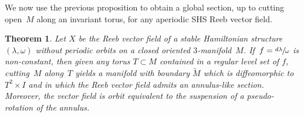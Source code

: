 \documentclass[JEP,XML,SOM,Unicode,NoEqCountersInSection,NoFloatCountersInSection,published]{cedram}
\newcommand{\threemanifold}{$3$\nobreakdash-mani\-fold\xspace}
\newtheorem{theorem}{Theorem}[section]
\theoremstyle{definition}
\begin{document}
We now use the previous proposition to obtain a global section, up to cutting open~$M$ along an invariant torus, for any aperiodic SHS Reeb vector field.\enlargethispage{\baselineskip}%

\begin{theorem}\label{thm:SHSannulus}
Let $X$ be the Reeb vector field of a stable Hamiltonian structure $(\lambda,\omega)$ without periodic orbits on a closed oriented \threemanifold~$M$. If~$f=\sfrac{d\lambda}{\omega}$ is non-constant, then given any torus $T\subset M$ contained in a regular level set of $f$, cutting~$M$ along~$T$ yields a manifold with boundary $\widetilde M$ which is diffeomorphic to $T^2\times I$ and in which the Reeb vector field admits an annulus-like section. Moreover, the vector field is orbit equivalent to the suspension of a pseudo-rotation of the annulus.
\end{theorem}
\end{document}
